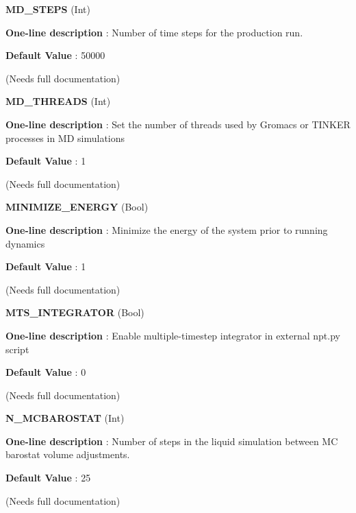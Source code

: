 \begin{DoxyItemize}
\item {\bfseries  M\-D\-\_\-\-S\-T\-E\-P\-S } (Int) \par
{\bfseries  One-\/line description }\-: Number of time steps for the production run. \par
{\bfseries  Default Value }\-: 50000 \par
(Needs full documentation)\end{DoxyItemize}
\begin{DoxyItemize}
\item {\bfseries  M\-D\-\_\-\-T\-H\-R\-E\-A\-D\-S } (Int) \par
{\bfseries  One-\/line description }\-: Set the number of threads used by Gromacs or T\-I\-N\-K\-E\-R processes in M\-D simulations \par
{\bfseries  Default Value }\-: 1 \par
(Needs full documentation)\end{DoxyItemize}
\begin{DoxyItemize}
\item {\bfseries  M\-I\-N\-I\-M\-I\-Z\-E\-\_\-\-E\-N\-E\-R\-G\-Y } (Bool) \par
{\bfseries  One-\/line description }\-: Minimize the energy of the system prior to running dynamics \par
{\bfseries  Default Value }\-: 1 \par
(Needs full documentation)\end{DoxyItemize}
\begin{DoxyItemize}
\item {\bfseries  M\-T\-S\-\_\-\-I\-N\-T\-E\-G\-R\-A\-T\-O\-R } (Bool) \par
{\bfseries  One-\/line description }\-: Enable multiple-\/timestep integrator in external npt.\-py script \par
{\bfseries  Default Value }\-: 0 \par
(Needs full documentation)\end{DoxyItemize}
\begin{DoxyItemize}
\item {\bfseries  N\-\_\-\-M\-C\-B\-A\-R\-O\-S\-T\-A\-T } (Int) \par
{\bfseries  One-\/line description }\-: Number of steps in the liquid simulation between M\-C barostat volume adjustments. \par
{\bfseries  Default Value }\-: 25 \par
(Needs full documentation)\end{DoxyItemize}
